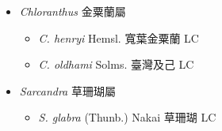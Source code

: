 
  \begin{itemize}
 \item[] \textit{Chloranthus} 金粟蘭屬
                                
  \begin{itemize}
        \item[] \textit{C. henryi} Hemsl.  寬葉金粟蘭   LC
        \item[] \textit{C. oldhami} Solms.  臺灣及己   LC
  \end{itemize}
 \item[] \textit{Sarcandra} 草珊瑚屬
                                
  \begin{itemize}
        \item[] \textit{S. glabra} (Thunb.) Nakai  草珊瑚   LC
  \end{itemize}
  \end{itemize}
